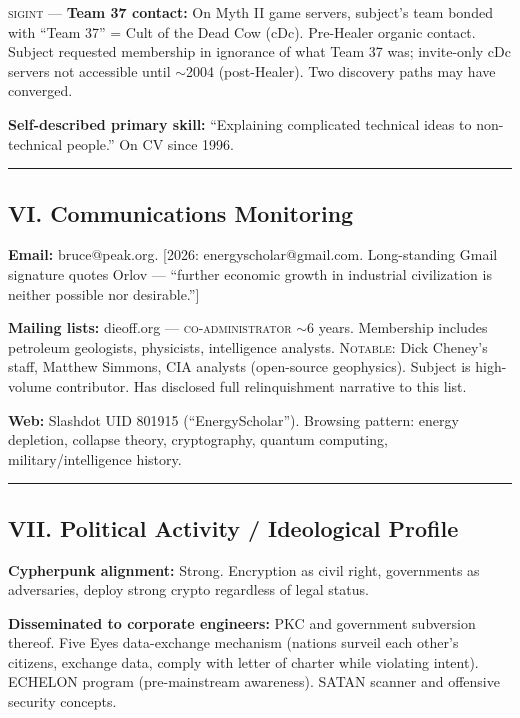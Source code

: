 \textsc{sigint} --- \textbf{Team 37 contact:} On Myth II game servers, subject's team bonded with ``Team 37'' = Cult of the Dead Cow (cDc). Pre-Healer organic contact. Subject requested membership in ignorance of what Team 37 was; invite-only cDc servers not accessible until $\sim$2004 (post-Healer). Two discovery paths may have converged.

\textbf{Self-described primary skill:} ``Explaining complicated technical ideas to non-technical people.'' On CV since 1996.

\vspace{1cm}\hrule\vspace{1cm}

\subsection*{VI. Communications Monitoring}
\label{record:tgt-communications-monitoring}

\textbf{Email:} bruce@peak.org. \textsc{[2026:} energyscholar@gmail.com. Long-standing Gmail signature quotes Orlov --- ``further economic growth in industrial civilization is neither possible nor desirable.''\textsc{]}

\textbf{Mailing lists:} dieoff.org --- \textsc{co-administrator} $\sim$6 years. Membership includes petroleum geologists, physicists, intelligence analysts. \textsc{Notable}: Dick Cheney's staff, Matthew Simmons, CIA analysts (open-source geophysics). Subject is high-volume contributor. Has disclosed full relinquishment narrative to this list.

\textbf{Web:} Slashdot UID 801915 (``EnergyScholar''). Browsing pattern: energy depletion, collapse theory, cryptography, quantum computing, military/intelligence history.

\vspace{1cm}\hrule\vspace{1cm}

\subsection*{VII. Political Activity / Ideological Profile}
\label{record:tgt-political-activity-ideological-profile}

\textbf{Cypherpunk alignment:} Strong. Encryption as civil right, governments as adversaries, deploy strong crypto regardless of legal status.

\textbf{Disseminated to corporate engineers:} PKC and government subversion thereof. Five Eyes data-exchange mechanism (nations surveil each other's citizens, exchange data, comply with letter of charter while violating intent). ECHELON program (pre-mainstream awareness). SATAN scanner and offensive security concepts.

